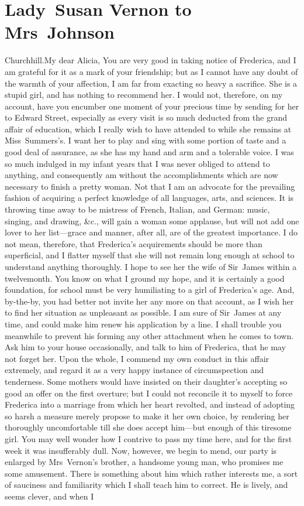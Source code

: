 \chapter{Lady~Susan Vernon to Mrs~Johnson}
  
  \begin{mail}{Churchhill.}{My dear Alicia,}
You are very good in taking notice of Frederica, and I am grateful for it as a mark of your friendship; but as I cannot have any doubt of the warmth of your affection, I am far from exacting so heavy a sacrifice. She is a stupid girl, and has nothing to recommend her. I would not, therefore, on my account, have you encumber one moment of your precious time by sending for her to Edward Street, especially as every visit is so much deducted from the grand affair of education, which I really wish to have attended to while she remains at Miss~Summers's. I want her to play and sing with some portion of taste and a good deal of assurance, as she has my hand and arm and a tolerable voice. I was so much indulged in my infant years that I was never obliged to attend to anything, and consequently am without the accomplishments which are now necessary to finish a pretty woman. Not that I am an advocate for the prevailing fashion of acquiring a perfect knowledge of all languages, arts, and sciences. It is throwing time away to be mistress of French, Italian, and German: music, singing, and drawing, \&c., will gain a woman some applause, but will not add one lover to her list—grace and manner, after all, are of the greatest importance. I do not mean, therefore, that Frederica's acquirements should be more than superficial, and I flatter myself that she will not remain long enough at school to understand anything thoroughly. I hope to see her the wife of Sir~James within a twelvemonth. You know on what I ground my hope, and it is certainly a good foundation, for school must be very humiliating to a girl of Frederica's age. And, by-the-by, you had better not invite her any more on that account, as I wish her to find her situation as unpleasant as possible. I am sure of Sir~James at any time, and could make him renew his application by a line. I shall trouble you meanwhile to prevent his forming any other attachment when he comes to town. Ask him to your house occasionally, and talk to him of Frederica, that he may not forget her. Upon the whole, I commend my own conduct in this affair extremely, and regard it as a very happy instance of circumspection and tenderness. Some mothers would have insisted on their daughter's accepting so good an offer on the first overture; but I could not reconcile it to myself to force Frederica into a marriage from which her heart revolted, and instead of adopting so harsh a measure merely propose to make it her own choice, by rendering her thoroughly uncomfortable till she does accept him—but enough of this tiresome girl. You may well wonder how I contrive to pass my time here, and for the first week it was insufferably dull. Now, however, we begin to mend, our party is enlarged by Mrs~Vernon's brother, a handsome young man, who promises me some amusement. There is something about him which rather interests me, a sort of sauciness and familiarity which I shall teach him to correct. He is lively, and seems clever, and when I 
\end{mail}
